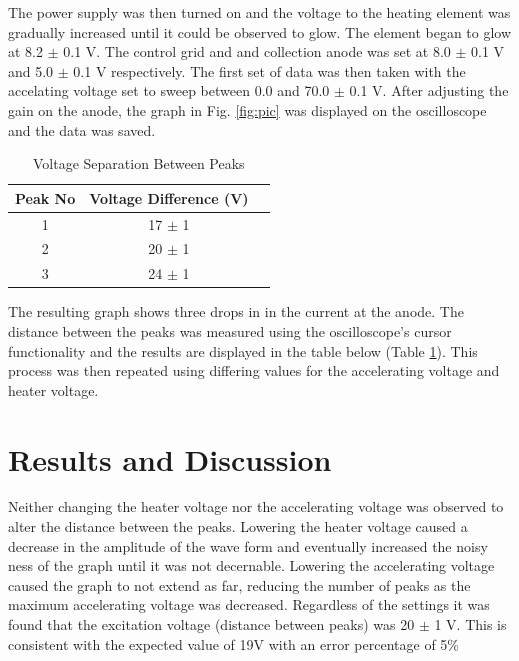 \documentclass[twocolumn,secnumarabic,amssymb, nobibnotes, aps, pra]{revtex4}
\begin{document}
The power supply was then turned on and the voltage to the heating element was gradually increased until it could be observed to glow.  The element began to glow at 8.2 $\pm$ 0.1 V.  The control grid and and collection anode was set at 8.0 $\pm$ 0.1 V and 5.0  $\pm$ 0.1 V respectively.  The first set of data was then taken with the accelating voltage set to sweep between 0.0 and 70.0  $\pm$ 0.1 V.  After adjusting the gain on the anode, the graph in Fig. \ref{fig:pic} was displayed on the oscilloscope and the data was saved.

\begin{table} [h]  %
\caption{Voltage Separation Between Peaks}      %
\centering              %
\begin{tabular}{ccc} %
\hline\hline %
  Peak No & Voltage Difference (V)   \\
\hline %
1 & 17 $\pm$ 1   \\
2 & 20 $\pm$ 1  \\
3 & 24 $\pm$ 1  \\
\hline %
\end{tabular}
\label{tab:peaks}
\end{table}

The resulting graph shows three drops in in the current at the anode.  The distance between the peaks was measured using the oscilloscope's cursor functionality and the results are displayed in the table below (Table \ref{tab:peaks}).  This process was then repeated using differing values for the accelerating voltage and heater voltage.  

\section{Results and Discussion}

Neither changing the heater voltage nor the accelerating voltage was observed to alter the distance between the peaks.  Lowering the heater voltage caused a decrease in the amplitude of the wave form and eventually increased the noisy ness of the graph until it was not decernable.  Lowering the accelerating voltage caused the graph to not extend as far, reducing the number of peaks as the maximum accelerating voltage was decreased.  Regardless of the settings it was found that the excitation voltage (distance between peaks) was 20 $\pm$ 1 V.  This is consistent with the expected value of 19V with an error percentage of 5\% 
\end{document}
